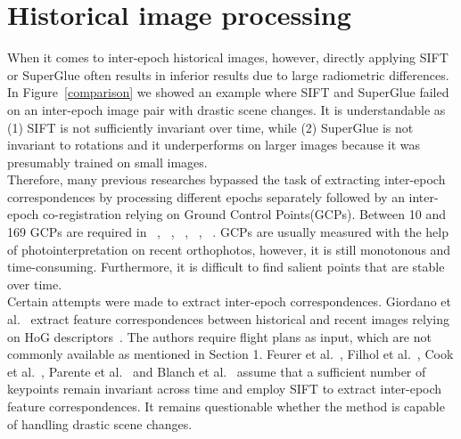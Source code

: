 \section{Historical image processing}
When it comes to inter-epoch historical images, however, directly applying SIFT or SuperGlue often results in inferior results due to large radiometric differences.
In Figure~\ref{comparison} we showed an example where SIFT and SuperGlue failed on an inter-epoch image pair with drastic scene changes. It is understandable as (1) SIFT is not sufficiently invariant over time, while (2) SuperGlue is not invariant to rotations and it underperforms on larger images because it was presumably trained on small images.\\
Therefore, many previous researches bypassed the task of extracting inter-epoch correspondences by processing different epochs separately followed by an inter-epoch co-registration relying on Ground Control Points(GCPs).
Between 10 and 169 GCPs are required in ~\cite{pinto2019archived}, ~\cite{bozek2019analysis}, ~\cite{persia2020archival}, ~\cite{micheletti2015application}, ~\cite{molg2017structure}.
GCPs are usually measured with the help of photointerpretation on recent orthophotos, however, it is still monotonous and time-consuming. Furthermore, it is difficult to find salient points that are stable over time.\\
Certain attempts were made to extract inter-epoch correspondences. Giordano et al.~\cite{giordano2018toward} extract feature correspondences between historical and recent images relying on HoG descriptors~\cite{dalal2005histograms}. The authors require flight plans as input, which are not commonly available as mentioned in Section 1. Feurer et al.~\cite{feurer2018joining}, Filhol et al.~\cite{filhol2019time}, Cook et al.~\cite{cook2019simple}, Parente et al.~\cite{parente2021automated} and Blanch et al.~\cite{blanch2021multi} assume that a sufficient number of keypoints remain invariant across time and employ SIFT to extract inter-epoch feature correspondences. It remains questionable whether the method is capable of handling drastic scene changes.
